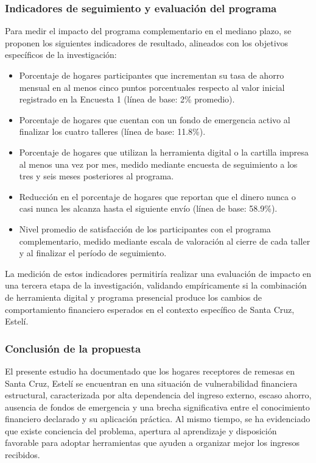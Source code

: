 \documentclass[12pt,letterpaper]{article}
\providecommand{\tightlist}{\setlength{\itemsep}{0pt}\setlength{\parskip}{0pt}}
\begin{document}
\subsubsection{\texorpdfstring{\textbf{Indicadores de seguimiento y evaluación del programa}}{Indicadores de seguimiento y evaluación del programa}}\label{indicadores-de-seguimiento-y-evaluaciuxf3n-del-programa}

Para medir el impacto del programa complementario en el mediano plazo, se proponen los siguientes indicadores de resultado, alineados con los objetivos específicos de la investigación:

\begin{itemize}
\tightlist
\item
  Porcentaje de hogares participantes que incrementan su tasa de ahorro mensual en al menos cinco puntos porcentuales respecto al valor inicial registrado en la Encuesta 1 (línea de base: 2\% promedio).
\item
  Porcentaje de hogares que cuentan con un fondo de emergencia activo al finalizar los cuatro talleres (línea de base: 11.8\%).
\item
  Porcentaje de hogares que utilizan la herramienta digital o la cartilla impresa al menos una vez por mes, medido mediante encuesta de seguimiento a los tres y seis meses posteriores al programa.
\item
  Reducción en el porcentaje de hogares que reportan que el dinero nunca o casi nunca les alcanza hasta el siguiente envío (línea de base: 58.9\%).
\item
  Nivel promedio de satisfacción de los participantes con el programa complementario, medido mediante escala de valoración al cierre de cada taller y al finalizar el período de seguimiento.
\end{itemize}

La medición de estos indicadores permitiría realizar una evaluación de impacto en una tercera etapa de la investigación, validando empíricamente si la combinación de herramienta digital y programa presencial produce los cambios de comportamiento financiero esperados en el contexto específico de Santa Cruz, Estelí.

\subsubsection{\texorpdfstring{\textbf{Conclusión de la propuesta}}{Conclusión de la propuesta}}\label{conclusiuxf3n-de-la-propuesta}

El presente estudio ha documentado que los hogares receptores de remesas en Santa Cruz, Estelí se encuentran en una situación de vulnerabilidad financiera estructural, caracterizada por alta dependencia del ingreso externo, escaso ahorro, ausencia de fondos de emergencia y una brecha significativa entre el conocimiento financiero declarado y su aplicación práctica. Al mismo tiempo, se ha evidenciado que existe conciencia del problema, apertura al aprendizaje y disposición favorable para adoptar herramientas que ayuden a organizar mejor los ingresos recibidos.
\end{document}
